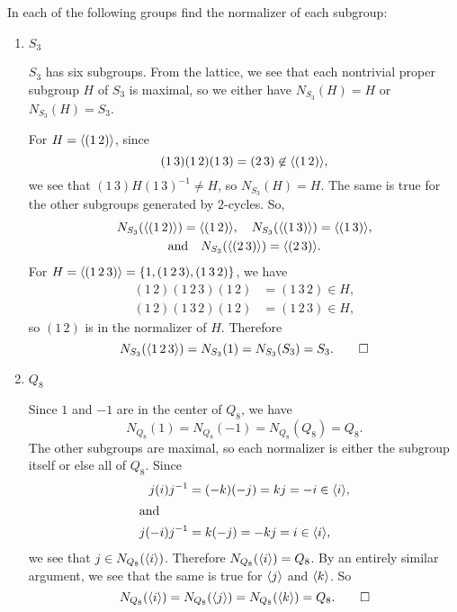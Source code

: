  In each of the following groups find the normalizer of each
subgroup:
\begin{enumerate}
\item $S_3$
  \begin{solution}
    $S_3$ has six subgroups. From the lattice, we see that each
    nontrivial proper subgroup $H$ of $S_3$ is maximal, so we either
    have $N_{S_3}(H) = H$ or $N_{S_3}(H) = S_3$.

    For $H = \langle{(1\,2)}\rangle$, since
    \begin{equation*}
      (1\,3)(1\,2)(1\,3) = (2\,3) \not\in \langle{(1\,2)}\rangle,
    \end{equation*}
    we see that $(1\,3)H(1\,3)^{-1} \neq H$, so $N_{S_3}(H) = H$. The
    same is true for the other subgroups generated by $2$-cycles. So,
    \begin{multline*}
      N_{S_3}(\langle{(1\,2)}\rangle) = \langle{(1\,2)}\rangle,
      \quad
      N_{S_3}(\langle{(1\,3)}\rangle) = \langle{(1\,3)}\rangle, \\
      \text{and}\quad
      N_{S_3}(\langle{(2\,3)}\rangle) = \langle{(2\,3)}\rangle.
    \end{multline*}
    For $H = \langle{(1\,2\,3)}\rangle = \{1,(1\,2\,3),(1\,3\,2)\}$, we have
    \begin{align*}
      (1\,2)(1\,2\,3)(1\,2) &= (1\,3\,2)\in H, \\
      (1\,2)(1\,3\,2)(1\,2) &= (1\,2\,3)\in H,
    \end{align*}
    so $(1\,2)$ is in the normalizer of $H$. Therefore
    \begin{equation*}
      N_{S_3}(\langle{1\,2\,3}\rangle) = N_{S_3}(1) = N_{S_3}(S_3) = S_3. \qedhere
    \end{equation*}
  \end{solution}
\item $Q_8$
  \begin{solution}
    Since $1$ and $-1$ are in the center of $Q_8$, we have
    \begin{equation*}
      N_{Q_8}(1) = N_{Q_8}(-1) = N_{Q_8}(Q_8) = Q_8.
    \end{equation*}
    The other subgroups are maximal, so each normalizer is either the
    subgroup itself or else all of $Q_8$. Since
    \begin{align*}
      j(i)j^{-1} &= (-k)(-j) = kj = -i\in\langle{i}\rangle, \\ \intertext{and}
      j(-i)j^{-1} &= k(-j) = -kj = i\in\langle{i}\rangle,
    \end{align*}
    we see that $j\in N_{Q_8}(\langle{i}\rangle)$. Therefore
    $N_{Q_8}(\langle{i}\rangle) = Q_8$. By an entirely similar argument, we see
    that the same is true for $\langle{j}\rangle$ and $\langle{k}\rangle$. So
    \begin{equation*}
      N_{Q_8}(\langle{i}\rangle) = N_{Q_8}(\langle{j}\rangle) = N_{Q_8}(\langle{k}\rangle) = Q_8. \qedhere
    \end{equation*}
  \end{solution}
\end{enumerate}
